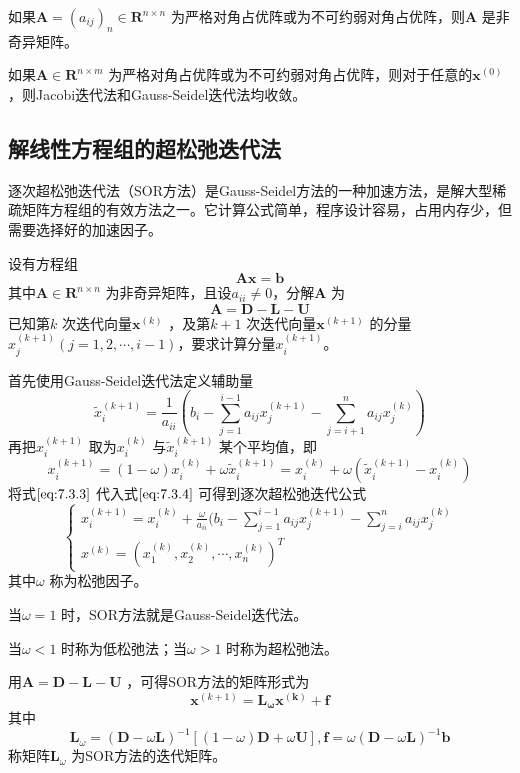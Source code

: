 \documentclass[a4paper]{article}
\begin{document}
\begin{theorem}
	如果$\mathbf{A} = (a_{ij})_n \in \mathbf{R}^{n \times n}$ 为严格对角占优阵或为不可约弱对角占优阵，则$\mathbf{A}$ 是非奇异矩阵。
\end{theorem}

\begin{theorem}
	如果$\mathbf{A} \in \mathbf{R}^{n \times m}$ 为严格对角占优阵或为不可约弱对角占优阵，则对于任意的$\mathbf{x}^{(0)}$ ，则Jacobi迭代法和Gauss-Seidel迭代法均收敛。
\end{theorem}

\subsection{解线性方程组的超松弛迭代法}
逐次超松弛迭代法（SOR方法）是Gauss-Seidel方法的一种加速方法，是解大型稀疏矩阵方程组的有效方法之一。它计算公式简单，程序设计容易，占用内存少，但需要选择好的加速因子。

设有方程组
\[
\mathbf{Ax = b} \tag{7.3.1} \label{eq:7.3.1} 
\] 
其中$\mathbf{A} \in \mathbf{R}^{n \times n}$ 为非奇异矩阵，且设$a_{ii} \neq 0$，分解$\mathbf{A}$ 为
\[
\mathbf{A = D - L - U} \tag{7.3.2} \label{eq:7.3.2} 
\] 
已知第$k$ 次迭代向量$\mathbf{x}^{(k)}$ ，及第$k+1$ 次迭代向量$\mathbf{x}^{(k+1)}$ 的分量$x_j^{(k+1)}(j=1,2,\cdots,i-1)$，要求计算分量$x_i^{(k+1)}$。

首先使用Gauss-Seidel迭代法定义辅助量
\[
	\tilde{x}_i^{(k+1)} = \frac{1}{a_{ii}} ( b_i - \sum_{j=1}^{i-1} a_{ij} x_j^{(k+1)} - \sum_{j=i+1}^{n} a_{ij} x_j^{(k)}) \tag{7.3.3} \label{eq:7.3.3} 
\] 
再把$x_i^{(k+1)}$ 取为$x_i^{(k)}$ 与$\tilde{x}_i^{(k+1)}$ 某个平均值，即
\[
x_i^{(k+1)} = (1 - \omega) x_{i}^{(k)} + \omega \tilde{x}_i^{(k+1)} = x_{i}^{(k)} + \omega (\tilde{x}_i^{(k+1)} - x_{i}^{(k)}) \tag{7.3.4} \label{eq:7.3.4} 
\] 
将式$\ref{eq:7.3.3}$ 代入式$\ref{eq:7.3.4}$ 可得到逐次超松弛迭代公式
\[
\tag{7.3.5} \label{eq:7.3.5} 
\begin{cases}
	x_{i}^{(k+1)} = x_{i}^{(k)} + \frac{\omega}{a_{ii}} (b_i - \sum_{j=1}^{i-1} a_{ij} x_{j}^{(k+1)} - \sum_{j=i}^{n} a_{ij} x_{j}^{(k)} \\
	x^{(k)} = (x_1^{(k)}, x_2^{(k)}, \cdots, x_{n}^{(k)})^{T}
\end{cases} 
\] 
其中$\omega$ 称为松弛因子。

当$\omega = 1$ 时，SOR方法就是Gauss-Seidel迭代法。

当$\omega < 1$ 时称为低松弛法；当$\omega > 1$ 时称为超松弛法。

用$\mathbf{A = D - L - U}$ ，可得SOR方法的矩阵形式为
\[
\mathbf{x}^{(k+1)} = \mathbf{L_\omega x^{(k)} + f} \tag{7.4.6} \label{eq:7.4.6} 
\] 
其中
\[
	\mathbf{L}_\omega = (\mathbf{D} - \omega \mathbf{L})^{-1} [(1 - \omega) \mathbf{D} + \omega \mathbf{U}], \mathbf{f} = \omega (\mathbf{D} - \omega \mathbf{L})^{-1} \mathbf{b}
\] 
称矩阵$\mathbf{L}_\omega$ 为SOR方法的迭代矩阵。
\end{document}
